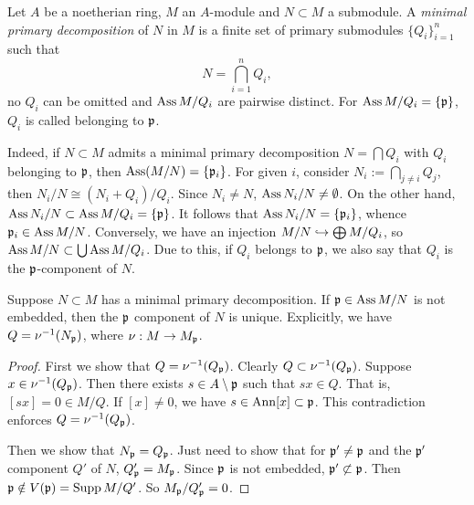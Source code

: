     \begin{definition}\label{def: minimal primary decomposition}
        Let $A$ be a noetherian ring, $M$ an $A$-module and $N \subset M$ a submodule.
        A \textit{minimal primary decomposition} of $N$ in $M$ is a finite set of primary submodules $\{Q_i\}_{i=1}^n$ such that 
        \[ N = \bigcap_{i=1}^n Q_i, \] 
        no $Q_i$ can be omitted and $\operatorname{Ass} M/Q_i$ are pairwise distinct.
        For $\operatorname{Ass} M/Q_i = \{{\mathfrak{p}}\}$, $Q_i$ is called belonging to ${\mathfrak{p}}$.
    \end{definition}

    Indeed, if $N \subset M$ admits a minimal primary decomposition $N = \bigcap Q_i$ with $Q_i$ belonging to ${\mathfrak{p}}$,
    then $\operatorname{Ass}(M/N) = \{{\mathfrak{p}}_i\}$.
    For given $i$, consider $N_i := \bigcap_{j\neq i} Q_j$, then $N_i/N \cong (N_i+Q_i)/Q_i$.
    Since $N_i \neq N$, $\operatorname{Ass} N_i/N \neq \emptyset$.
    On the other hand, $\operatorname{Ass} N_i/N \subset \operatorname{Ass} M/Q_i = \{{\mathfrak{p}}\}$.
    It follows that $\operatorname{Ass} N_i/N = \{{\mathfrak{p}}_i\}$, whence ${\mathfrak{p}}_i \in \operatorname{Ass} M/N$.
    Conversely, we have an injection $M/N \hookrightarrow \bigoplus M/Q_i$, so $\operatorname{Ass} M/N \subset \bigcup \operatorname{Ass} M/Q_i$.
    Due to this, if $Q_i$ belongs to ${\mathfrak{p}}$, we also say that $Q_i$ is the ${\mathfrak{p}}$-component of $N$.

    \begin{proposition}\label{prop: uniqueness of primary components}
        Suppose $N\subset M$ has a minimal primary decomposition.
        If ${\mathfrak{p}} \in \operatorname{Ass} M/N$ is not embedded, then the ${\mathfrak{p}}$ component of $N$ is unique.
        Explicitly, we have $Q = \nu^{-1}(N_{\mathfrak{p}})$, where $\nu:M \to M_{{\mathfrak{p}}}$.
    \end{proposition}
    \begin{proof}
        First we show that $Q = \nu^{-1} (Q_{\mathfrak{p}})$.
        Clearly $Q \subset \nu^{-1}(Q_{\mathfrak{p}})$.
        Suppose $x \in \nu^{-1}(Q_{\mathfrak{p}})$.
        Then there exists $s \in A \setminus {\mathfrak{p}}$ such that $sx \in Q$.
        That is, $[sx] = 0 \in M/Q$.
        If $[x] \neq 0$, we have $s \in \operatorname{Ann} [x] \subset {\mathfrak{p}}$.
        This contradiction enforces $Q = \nu^{-1}(Q_{\mathfrak{p}})$.

        Then we show that $N_{\mathfrak{p}} = Q_{\mathfrak{p}}$.
        Just need to show that for ${\mathfrak{p}}' \neq {\mathfrak{p}}$ and the ${\mathfrak{p}}'$ component $Q'$ of $N$, $Q'_{\mathfrak{p}} = M_{\mathfrak{p}}$.
        Since ${\mathfrak{p}}$ is not embedded, ${\mathfrak{p}}' \not\subset {\mathfrak{p}}$.
        Then ${\mathfrak{p}} \notin V({\mathfrak{p}}) = \operatorname{Supp} M/Q'$.
        So $M_{\mathfrak{p}}/Q'_{\mathfrak{p}} = 0$.
    \end{proof}

